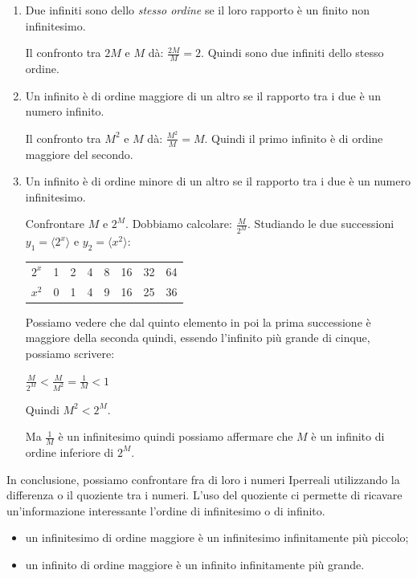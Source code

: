 \begin{enumerate}
 \item Due infiniti sono dello \emph{stesso ordine} se il loro rapporto è un 
finito non infinitesimo.
\begin{esempio}
 Il confronto tra $2M$ e $M$ dà: $\frac{2M}{M} = 2$. Quindi sono due infiniti 
dello stesso ordine.
\end{esempio}
 \item Un infinito è di ordine maggiore di un altro se il rapporto tra i due 
è 
un numero infinito.
\begin{esempio}
 Il confronto tra $M^2$ e $M$ dà: $\frac{M^2}{M} = M$. Quindi il primo 
infinito 
è di ordine maggiore del secondo.
\end{esempio}
 \item Un infinito è di ordine minore di un altro se il rapporto tra i due è 
un numero infinitesimo.
\begin{esempio}
 Confrontare $M$ e $2^M$. Dobbiamo calcolare: $\frac{M}{2^M}$. 
Studiando le due successioni 
$y_1=\langle 2^x \rangle$ e $y_2=\langle x^2 \rangle$:
\begin{center}
\begin{tabular}{cccccccc}
$2^x$ & 1 & 2 & 4 & 8 & 16 & 32 & 64\\
$x^2$ & 0 & 1 & 4 & 9 & 16 & 25 & 36
\end{tabular}
\end{center}
Possiamo vedere che dal quinto elemento in poi la prima successione è 
maggiore 
della seconda quindi, essendo l'infinito più grande di cinque, possiamo 
scrivere:

$\frac{M}{2^M} < \frac{M}{M^2} = \frac{1}{M} < 1$

Quindi $M^2 < 2^M$.

Ma $\frac{1}{M}$ è un infinitesimo quindi possiamo affermare che $M$ è un 
infinito di ordine inferiore di $2^M$.
\end{esempio}
\end{enumerate}

In conclusione, possiamo confrontare fra di loro i numeri Iperreali 
utilizzando 
la differenza o il quoziente tra i numeri. L'uso del quoziente ci permette di 
ricavare un'informazione interessante l'ordine di infinitesimo o di infinito.
\begin{itemize} [noitemsep]
 \item un infinitesimo di ordine maggiore è un infinitesimo infinitamente più 
piccolo;
 \item un infinito di ordine maggiore è un infinito infinitamente più 
grande.
\end{itemize}

